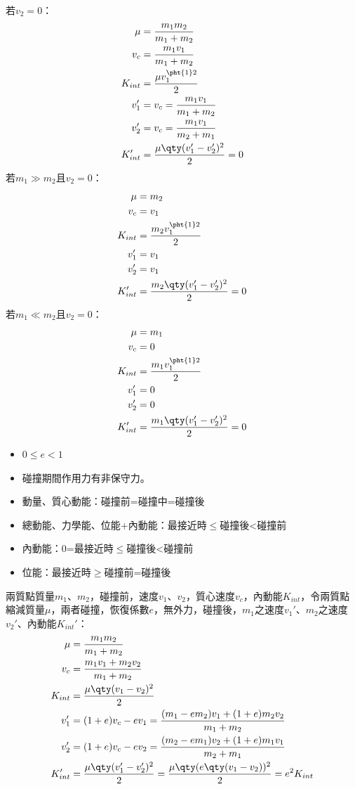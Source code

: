\documentclass[a4paper,12pt]{article}
\begin{document}
若$v_2=0$：
\[\begin{aligned}
\mu&=\frac{m_1m_2}{m_1+m_2}\\
v_c &= \frac{m_1v_1}{m_1+m_2} \\
K_{int} &= \frac{\mu v_1^{\pht{1}2}}{2}\\
v_1' &= v_c = \frac{m_1v_1}{m_1+m_2} \\
v_2' &= v_c = \frac{m_1v_1}{m_2+m_1} \\
K_{int}' &= \frac{\mu \qty(v_1'-v_2')^2}{2} = 0
\end{aligned}\]
若$m_1\gg m_2$且$v_2=0$：
\[\begin{aligned}
\mu&=m_2\\
v_c &= v_1 \\
K_{int} &= \frac{m_2v_1^{\pht{1}2}}{2}\\
v_1' &= v_1 \\
v_2' &= v_1 \\
K_{int}' &= \frac{m_2 \qty(v_1'-v_2')^2}{2} = 0
\end{aligned}\]
若$m_1\ll m_2$且$v_2=0$：
\[\begin{aligned}
\mu&=m_1\\
v_c &= 0 \\
K_{int} &= \frac{m_1v_1^{\pht{1}2}}{2}\\
v_1' &= 0 \\
v_2' &= 0 \\
K_{int}' &= \frac{m_1\qty(v_1'-v_2')^2}{2} = 0
\end{aligned}\]
\begin{itemize}
\item $0\leq e<1$
\item 碰撞期間作用力有非保守力。
\item 動量、質心動能：碰撞前=碰撞中=碰撞後
\item 總動能、力學能、位能+內動能：最接近時$\leq$碰撞後<碰撞前
\item 內動能：0=最接近時$\leq$碰撞後<碰撞前
\item 位能：最接近時$\geq$碰撞前=碰撞後
\end{itemize}
兩質點質量$m_1$、$m_2$，碰撞前，速度$v_1$、$v_2$，質心速度$v_c$，內動能$K_{int}$，令兩質點縮減質量$\mu$，兩者碰撞，恢復係數$e$，無外力，碰撞後，$m_1$之速度$v_1'$、$m_2$之速度$v_2'$、內動能$K_{int}'$：
\[\begin{aligned}
\mu&=\frac{m_1m_2}{m_1+m_2}\\
v_c &= \frac{m_1v_1+m_2v_2}{m_1+m_2} \\
K_{int} &= \frac{\mu\qty(v_1-v_2)^2}{2}\\
v_1' &= (1+e)v_c - ev_1 = \frac{(m_1-em_2)v_1+(1+e)m_2v_2}{m_1+m_2} \\
v_2' &= (1+e)v_c - ev_2 = \frac{(m_2-em_1)v_2+(1+e)m_1v_1}{m_2+m_1} \\
K_{int}' &= \frac{\mu \qty(v_1'-v_2')^2}{2} = \frac{\mu \qty(e\qty(v_1-v_2))^2}{2} = e^2K_{int}
\end{aligned}\]
\end{document}
